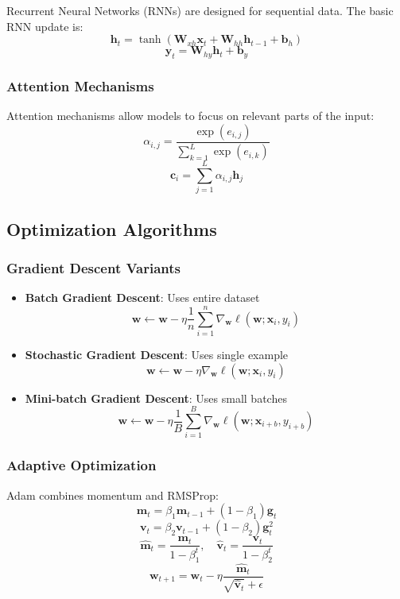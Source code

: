 \documentclass{article}
\begin{document}
Recurrent Neural Networks (RNNs) are designed for sequential data.
The basic RNN update is:
\[
\mathbf{h}_t = \tanh(\mathbf{W}_{xh} \mathbf{x}_t + \mathbf{W}_{hh} \mathbf{h}_{t-1} + \mathbf{b}_h)
\]
\[
\mathbf{y}_t = \mathbf{W}_{hy} \mathbf{h}_t + \mathbf{b}_y
\]

\subsubsection{Attention Mechanisms}

Attention mechanisms allow models to focus on relevant parts of the input:
\[
\alpha_{i,j} = \frac{\exp(e_{i,j})}{\sum_{k=1}^L \exp(e_{i,k})}
\]
\[
\mathbf{c}_i = \sum_{j=1}^L \alpha_{i,j} \mathbf{h}_j
\]

\subsection{Optimization Algorithms}

\subsubsection{Gradient Descent Variants}

\begin{itemize}
\item \textbf{Batch Gradient Descent}: Uses entire dataset
\[
\mathbf{w} \leftarrow \mathbf{w} - \eta \frac{1}{n} \sum_{i=1}^n \nabla_\mathbf{w} \ell(\mathbf{w}; \mathbf{x}_i, y_i)
\]

\item \textbf{Stochastic Gradient Descent}: Uses single example
\[
\mathbf{w} \leftarrow \mathbf{w} - \eta \nabla_\mathbf{w} \ell(\mathbf{w}; \mathbf{x}_i, y_i)
\]

\item \textbf{Mini-batch Gradient Descent}: Uses small batches
\[
\mathbf{w} \leftarrow \mathbf{w} - \eta \frac{1}{B} \sum_{i=1}^B \nabla_\mathbf{w} \ell(\mathbf{w}; \mathbf{x}_{i+b}, y_{i+b})
\]
\end{itemize}

\subsubsection{Adaptive Optimization}

Adam combines momentum and RMSProp:
\[
\mathbf{m}_t = \beta_1 \mathbf{m}_{t-1} + (1 - \beta_1) \mathbf{g}_t
\]
\[
\mathbf{v}_t = \beta_2 \mathbf{v}_{t-1} + (1 - \beta_2) \mathbf{g}_t^2
\]
\[
\hat{\mathbf{m}}_t = \frac{\mathbf{m}_t}{1 - \beta_1^t}, \quad
\hat{\mathbf{v}}_t = \frac{\mathbf{v}_t}{1 - \beta_2^t}
\]
\[
\mathbf{w}_{t+1} = \mathbf{w}_t - \eta \frac{\hat{\mathbf{m}}_t}{\sqrt{\hat{\mathbf{v}}_t} + \epsilon}
\]
\end{document}
